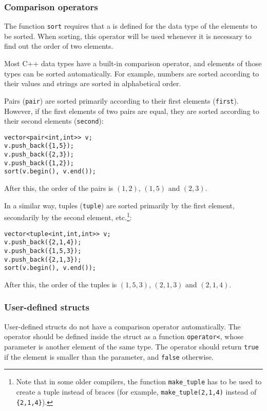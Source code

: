\subsubsection{Comparison operators}


The function \texttt{sort} requires that
a  is defined for the data type
of the elements to be sorted.
When sorting, this operator will be used
whenever it is necessary to find out the order of two elements.

Most C++ data types have a built-in comparison operator,
and elements of those types can be sorted automatically.
For example, numbers are sorted according to their values
and strings are sorted in alphabetical order.


Pairs (\texttt{pair}) are sorted primarily according to their
first elements (\texttt{first}).
However, if the first elements of two pairs are equal,
they are sorted according to their second elements (\texttt{second}):
\begin{lstlisting}
vector<pair<int,int>> v;
v.push_back({1,5});
v.push_back({2,3});
v.push_back({1,2});
sort(v.begin(), v.end());
\end{lstlisting}
After this, the order of the pairs is
$(1,2)$, $(1,5)$ and $(2,3)$.


In a similar way, tuples (\texttt{tuple})
are sorted primarily by the first element,
secondarily by the second element, etc.\footnote{Note that in some older compilers,
the function \texttt{make\_tuple} has to be used to create a tuple instead of
braces (for example, \texttt{make\_tuple(2,1,4)} instead of \texttt{\{2,1,4\}}).}:
\begin{lstlisting}
vector<tuple<int,int,int>> v;
v.push_back({2,1,4});
v.push_back({1,5,3});
v.push_back({2,1,3});
sort(v.begin(), v.end());
\end{lstlisting}
After this, the order of the tuples is
$(1,5,3)$, $(2,1,3)$ and $(2,1,4)$.

\subsubsection{User-defined structs}

User-defined structs do not have a comparison
operator automatically.
The operator should be defined inside
the struct as a function
\texttt{operator<},
whose parameter is another element of the same type.
The operator should return \texttt{true}
if the element is smaller than the parameter,
and \texttt{false} otherwise.

